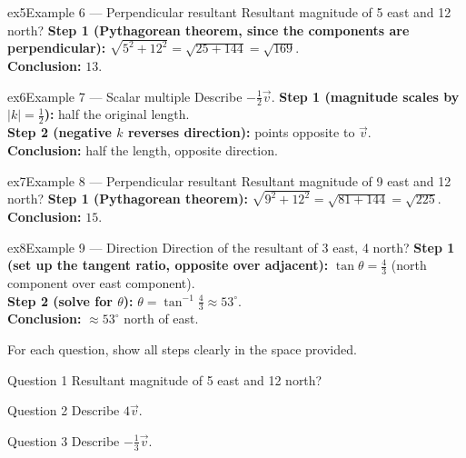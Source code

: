 \documentclass[11pt]{article}
\begin{document}
\begin{example}{ex5}{Example 6 --- Perpendicular resultant}
Resultant magnitude of 5 east and 12 north?\soln
\textbf{Step 1 (Pythagorean theorem, since the components are perpendicular):} $\sqrt{5^2+12^2}=\sqrt{25+144}=\sqrt{169}$.\\[3pt]
\textbf{Conclusion:} $13$.
\end{example}

\begin{example}{ex6}{Example 7 --- Scalar multiple}
Describe $-\tfrac12\vec v$.\soln
\textbf{Step 1 (magnitude scales by $|k|=\tfrac12$):} half the original length.\\[3pt]
\textbf{Step 2 (negative $k$ reverses direction):} points opposite to $\vec v$.\\[3pt]
\textbf{Conclusion:} half the length, opposite direction.
\end{example}

\begin{example}{ex7}{Example 8 --- Perpendicular resultant}
Resultant magnitude of 9 east and 12 north?\soln
\textbf{Step 1 (Pythagorean theorem):} $\sqrt{9^2+12^2}=\sqrt{81+144}=\sqrt{225}$.\\[3pt]
\textbf{Conclusion:} $15$.
\end{example}

\begin{example}{ex8}{Example 9 --- Direction}
Direction of the resultant of 3 east, 4 north?\soln
\textbf{Step 1 (set up the tangent ratio, opposite over adjacent):} $\tan\theta=\tfrac{4}{3}$ (north component over east component).\\[3pt]
\textbf{Step 2 (solve for $\theta$):} $\theta=\tan^{-1}\tfrac43\approx53^\circ$.\\[3pt]
\textbf{Conclusion:} $\approx53^\circ$ north of east.
\end{example}

\clearpage
{}
For each question, show all steps clearly in the space provided.

\begin{qbox}{Question 1}
Resultant magnitude of 5 east and 12 north?\workspace{2.4cm}
\end{qbox}

\begin{qbox}{Question 2}
Describe $4\vec v$.\workspace{2.4cm}
\end{qbox}

\begin{qbox}{Question 3}
Describe $-\tfrac13\vec v$.\workspace{2.4cm}
\end{qbox}
\end{document}
